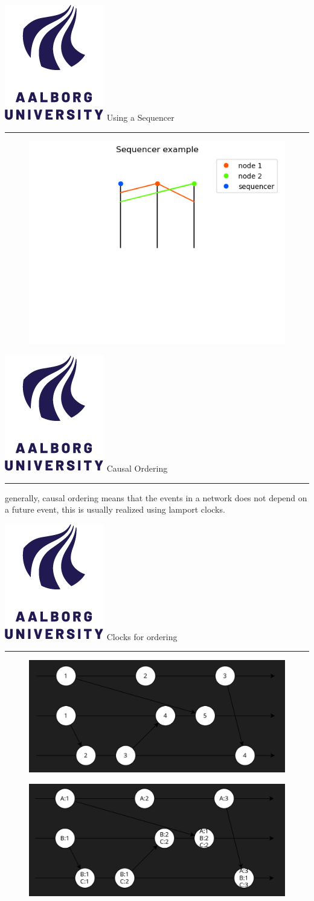 \documentclass[aspectratio=1610,17pt,utf8]{beamer}
\newcommand{\regularframe}[1]{\color{black}\includegraphics[width=.05\textwidth]{figures/aau.png} #1\\\hrule}
\begin{document}
\begin{frame}{\regularframe{Using a Sequencer}}
    \begin{figure}
        \includegraphics[width=\textwidth]{figures/2-sequencer.png}
    \end{figure}
\end{frame}

\begin{frame}{\regularframe{Causal Ordering}}
    generally, causal ordering means that the events in a network does not depend on a future event, this is usually realized using lamport clocks.


\end{frame}

\begin{frame}{\regularframe{Clocks for ordering}}
    \begin{figure}
        \includegraphics[width=.5\textwidth]{figures/2-lamport.png}
    \end{figure}
    \begin{figure}
        \includegraphics[width=.5\textwidth]{figures/2-vector.png}
    \end{figure}
\end{frame}
\end{document}
